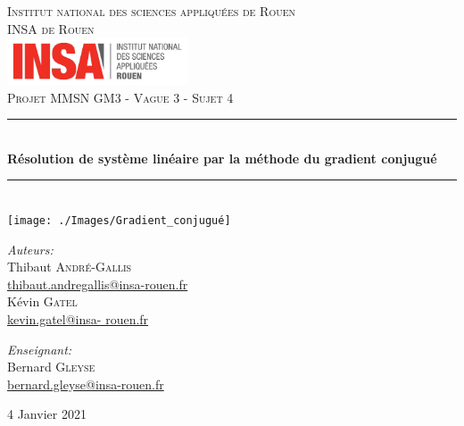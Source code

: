 \documentclass[12,french]{report}
\newcommand{\HRule}{\rule{\linewidth}{0.5mm}}
\begin{document}
\hypersetup{pdfborder=0 0 0}

\begin{titlepage}

\begin{center}
	\textsc{{\LARGE Institut national des sciences appliquées de Rouen} \\ 			\vspace{6mm} {\Large INSA de Rouen}} \\
	\vspace{5mm}
	\includegraphics[width=0.4\textwidth]{./Images/insa}\\[1.0 cm]

	\textsc{\Large Projet MMSN GM3 - Vague 3 - Sujet 4}\\[0.6cm]

	\HRule \\[0.5cm]
	{ \Huge \bfseries Résolution de système linéaire par la méthode du gradient conjugué}\\[0.2cm]
	\HRule \\[0.75cm]

	\texttt{[image: ./Images/Gradient\_conjugué]}\\[0.5 cm]

	\begin{minipage}{0.4\textwidth}
		\begin{flushleft} \large
			\emph{Auteurs:}\\
			Thibaut \textsc{André-Gallis} \\
			{\small\href{mailto:thibaut.andregallis@insa-rouen.fr}{thibaut.andregallis@insa-rouen.fr}} \\
			Kévin \textsc{Gatel} \\
			{\small\href{mailto:kevin.gatel@insa-rouen.fr}{kevin.gatel@insa-				rouen.fr}}
		\end{flushleft}
	\end{minipage}
	\begin{minipage}{0.4\textwidth}
		\begin{flushright} \large
			\emph{Enseignant:} \\
			Bernard \textsc{Gleyse} \\
			{\small\href{mailto:bernard.gleyse@insa-rouen.fr}								{bernard.gleyse@insa-rouen.fr}}
		\end{flushright}
	\end{minipage}

	\vfill
	{\large 4 Janvier 2021}
\end{center}
\end{titlepage}
\end{document}
